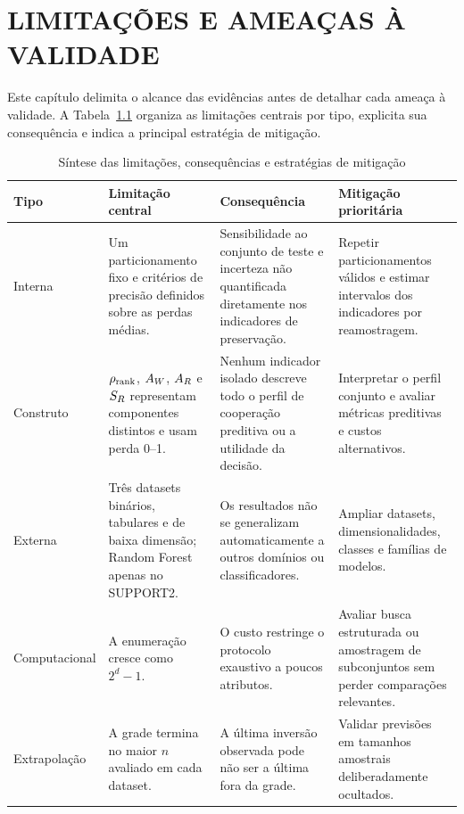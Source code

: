 \chapter{LIMITAÇÕES E AMEAÇAS À VALIDADE}
\label{chap:limitacoes}

Este capítulo delimita o alcance das evidências antes de detalhar cada ameaça à validade. A Tabela~\ref{tab:limitacoes-sintese} organiza as limitações centrais por tipo, explicita sua consequência e indica a principal estratégia de mitigação.

\begin{table}[H]
  \centering
  \caption{Síntese das limitações, consequências e estratégias de mitigação}
  \label{tab:limitacoes-sintese}
  \small
  \renewcommand{\arraystretch}{1.12}
  \begin{tabularx}{\textwidth}{@{}>{\raggedright\arraybackslash}p{2.45cm}XXX@{}}
    \toprule
    \textbf{Tipo} & \textbf{Limitação central} & \textbf{Consequência} & \textbf{Mitigação prioritária} \\
    \midrule
    Interna & Um particionamento fixo e critérios de precisão definidos sobre as perdas médias. & Sensibilidade ao conjunto de teste e incerteza não quantificada diretamente nos indicadores de preservação. & Repetir particionamentos válidos e estimar intervalos dos indicadores por reamostragem. \\
    \addlinespace
    Construto & $\rho_{\mathrm{rank}}$, $A_W$, $A_R$ e $S_R$ representam componentes distintos e usam perda 0--1. & Nenhum indicador isolado descreve todo o perfil de cooperação preditiva ou a utilidade da decisão. & Interpretar o perfil conjunto e avaliar métricas preditivas e custos alternativos. \\
    \addlinespace
    Externa & Três datasets binários, tabulares e de baixa dimensão; Random Forest apenas no SUPPORT2. & Os resultados não se generalizam automaticamente a outros domínios ou classificadores. & Ampliar datasets, dimensionalidades, classes e famílias de modelos. \\
    \addlinespace
    Computacional & A enumeração cresce como $2^d-1$. & O custo restringe o protocolo exaustivo a poucos atributos. & Avaliar busca estruturada ou amostragem de subconjuntos sem perder comparações relevantes. \\
    \addlinespace
    Extrapolação & A grade termina no maior $n$ avaliado em cada dataset. & A última inversão observada pode não ser a última fora da grade. & Validar previsões em tamanhos amostrais deliberadamente ocultados. \\
    \bottomrule
  \end{tabularx}
\end{table}

